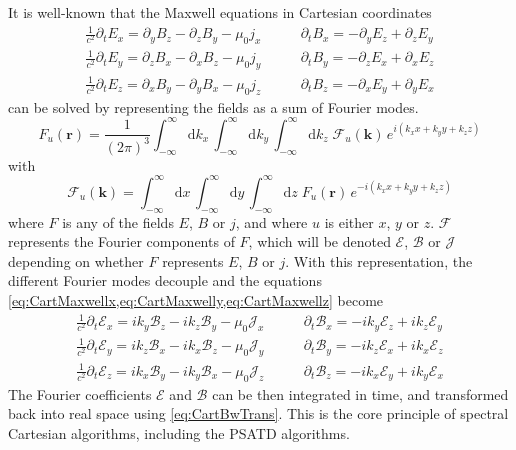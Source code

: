 \documentclass[1p,times]{elsarticle}
\newcommand{\Integ}[1]{\int_{-\infty}^{\infty} \!\!\!\!\!\!
  \mathrm{d}#1}
\renewcommand{\vec}[1]{\boldsymbol{#1}}
\begin{document}
It is well-known that the Maxwell equations in Cartesian coordinates 
\begin{subequations}
\begin{align}
\frac{1}{c^2}\partial_t E_x = \partial_y B_z - \partial_z B_y - \mu_0  j_x \qquad&   
\partial_t B_x = -\partial_y E_z + \partial_z E_y \label{eq:CartMaxwellx} \\
\frac{1}{c^2}\partial_t E_y = \partial_z B_x - \partial_x B_z - \mu_0  j_y \qquad &   
\partial_t B_y = -\partial_z E_x + \partial_x E_z \label{eq:CartMaxwelly}  \\
\frac{1}{c^2}\partial_t E_z = \partial_x B_y - \partial_y B_x - \mu_0  j_z \qquad &   
\partial_t B_z = -\partial_x E_y + \partial_y E_x \label{eq:CartMaxwellz} 
\end{align}
\end{subequations}
can be solved by representing the fields as a sum of Fourier modes.
\begin{equation}
\label{eq:CartBwTrans}
F_u(\vec{r}) = \frac{1}{(2\pi)^{3}}\Integ{k_x} \,\Integ{k_y}\,
\Integ{k_z} \; \mathcal{F}_u(\vec{k}) \, e^{i(k_x x + k_y y + k_z z)} 
\end{equation}
with 
\begin{equation}
\label{eq:CartFwTrans}
\mathcal{F}_u(\vec{k})  = \Integ{x} \,\Integ{y}\, \Integ{z} \;
F_u(\vec{r}) \, e^{-i(k_x x + k_y y + k_z z)} 
\end{equation}
where $F$ is any of the fields $E$, $B$ or $j$, and where $u$ is
either $x$, $y$ or $z$. $\mathcal{F}$ represents the Fourier
components of $F$, which will be denoted
$\mathcal{E}$, $\mathcal{B}$ or $\mathcal{J}$ depending on whether
$F$ represents $E$, $B$ or $j$. With this representation, the
different Fourier modes decouple and the equations 
\cref{eq:CartMaxwellx,eq:CartMaxwelly,eq:CartMaxwellz} become 
\begin{subequations}
\begin{align}
\frac{1}{c^2}\partial_t \mathcal{E}_x = ik_y \mathcal{B}_z - ik_z \mathcal{B}_y - \mu_0 \mathcal{J}_x \qquad &   
\partial_t \mathcal{B}_x = -ik_y \mathcal{E}_z + ik_z \mathcal{E}_y \label{eq:CartSpectMaxwellx}\\
\frac{1}{c^2}\partial_t \mathcal{E}_y = ik_z \mathcal{B}_x - ik_x \mathcal{B}_z - \mu_0  \mathcal{J}_y \qquad &   
\partial_t \mathcal{B}_y = -ik_z \mathcal{E}_x + ik_x \mathcal{E}_z \label{eq:CartSpectMaxwelly}\\
\frac{1}{c^2}\partial_t \mathcal{E}_z = ik_x \mathcal{B}_y - ik_y \mathcal{B}_x - \mu_0 \mathcal{J}_z  \qquad &   
\partial_t \mathcal{B}_z = -ik_x \mathcal{E}_y + ik_y \mathcal{E}_x \label{eq:CartSpectMaxwellz}
\end{align}
\end{subequations}
The Fourier coefficients $\mathcal{E}$ and $\mathcal{B}$ can be then integrated in time, and
transformed back into real space using \cref{eq:CartBwTrans}. This is
the core principle of spectral Cartesian algorithms, including the PSATD algorithms.
\end{document}
